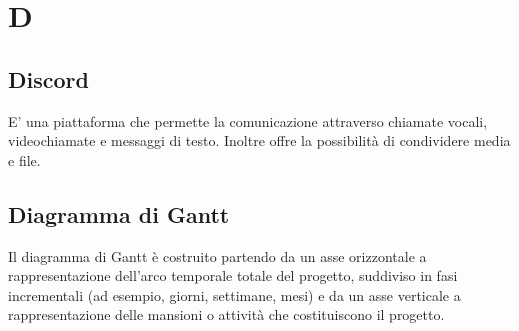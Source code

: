 \section{D}
\subsection{Discord}
E' una piattaforma che permette la comunicazione attraverso chiamate vocali, videochiamate e messaggi di testo.  Inoltre offre la possibilità di condividere media e file.
\subsection{Diagramma di Gantt}
Il diagramma di Gantt è costruito partendo da un asse orizzontale a rappresentazione dell'arco temporale totale del progetto, suddiviso in fasi incrementali (ad esempio, giorni, settimane, mesi) e da un asse verticale a rappresentazione delle mansioni o attività che costituiscono il progetto.
\clearpage